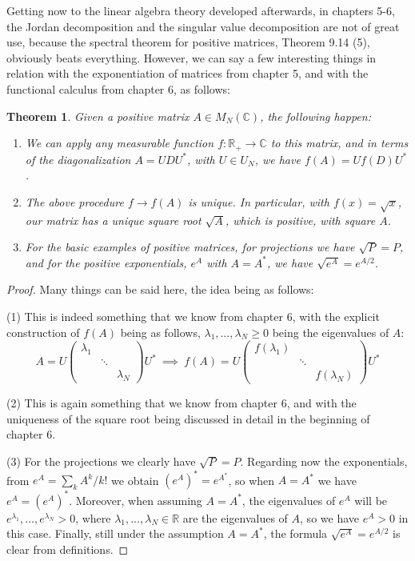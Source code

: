 \documentclass[12pt]{amsbook}
\newtheorem{theorem}{Theorem}[chapter]
\begin{document}
Getting now to the linear algebra theory developed afterwards, in chapters 5-6, the Jordan decomposition and the singular value decomposition are not of great use, because the spectral theorem for positive matrices, Theorem 9.14 (5), obviously beats everything. However, we can say a few interesting things in relation with the exponentiation of matrices from chapter 5, and with the functional calculus from chapter 6, as follows:

\begin{theorem}
Given a positive matrix $A\in M_N(\mathbb C)$, the following happen:
\begin{enumerate}
\item We can apply any measurable function $f:\mathbb R_+\to\mathbb C$ to this matrix, and in terms of the diagonalization $A=UDU^*$, with $U\in U_N$, we have $f(A)=Uf(D)U^*$.

\item The above procedure $f\to f(A)$ is unique. In particular, with $f(x)=\sqrt{x}$, our matrix has a unique square root $\sqrt{A}$, which is positive, with square $A$.

\item For the basic examples of positive matrices, for projections we have $\sqrt{P}=P$, and for the positive exponentials, $e^A$ with $A=A^*$, we have $\sqrt{e^A}=e^{A/2}$.
\end{enumerate}
\end{theorem}

\begin{proof}
Many things can be said here, the idea being as follows:

\medskip

(1) This is indeed something that we know from chapter 6, with the explicit construction of $f(A)$ being as follows, $\lambda_1,\ldots,\lambda_N\geq0$ being the eigenvalues of $A$:
$$A=U\begin{pmatrix}
\lambda_1\\ 
&\ddots\\
&&\lambda_N
\end{pmatrix}U^*
\ \implies\ 
f(A)=U\begin{pmatrix}
f(\lambda_1)\\ 
&\ddots\\
&&f(\lambda_N)
\end{pmatrix}U^*$$

(2) This is again something that we know from chapter 6, and with the uniqueness of the square root being discussed in detail in the beginning of chapter 6.

\medskip

(3) For the projections we clearly have $\sqrt{P}=P$. Regarding now the exponentials, from $e^A=\sum_kA^k/k!$ we obtain $(e^A)^*=e^{A^*}$, so when $A=A^*$ we have $e^A=(e^A)^*$. Moreover, when assuming $A=A^*$, the eigenvalues of $e^A$ will be $e^{\lambda_1},\ldots,e^{\lambda_N}>0$, where $\lambda_1,\ldots,\lambda_N\in\mathbb R$ are the eigenvalues of $A$, so we have $e^A>0$ in this case. Finally, still under the assumption $A=A^*$, the formula $\sqrt{e^A}=e^{A/2}$ is clear from definitions.
\end{proof}
\end{document}
